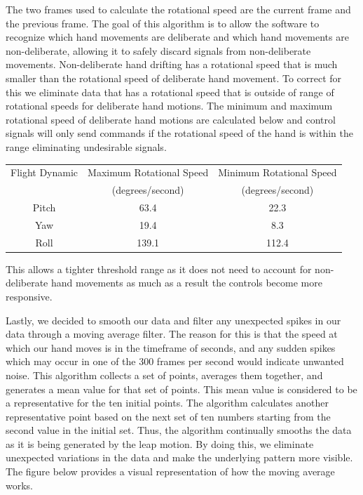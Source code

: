 \documentclass[letterpaper,english, 12pt]{article}
\begin{document}
The two frames used to calculate the rotational speed are the current frame and the previous frame. The goal of this algorithm is to allow the software to recognize which hand movements are deliberate and which hand movements are non-deliberate, allowing it to safely discard signals from non-deliberate movements. Non-deliberate hand drifting has a rotational speed that is much smaller than the rotational speed of deliberate hand movement. To correct for this we eliminate data that has a rotational speed that is outside of range of rotational speeds for deliberate hand motions.
The minimum and maximum rotational speed of deliberate hand motions are calculated below and control signals will only send commands if the rotational speed of the hand is within the range eliminating undesirable signals.

\begin{center}
	\begin{tabular}{|c|c|c|}
		\hline
			Flight Dynamic & Maximum Rotational Speed & Minimum Rotational Speed \\
			 & (degrees/second) & (degrees/second) \\
		\hline
			Pitch & 63.4 & 22.3 \\
		\hline
			Yaw & 19.4 & 8.3 \\
		\hline
			Roll & 139.1 & 112.4 \\
		\hline
	\end{tabular}
\end{center}

This allows a tighter threshold range as it does not need to account for non-deliberate hand movements as much as a result the controls become more responsive.

Lastly, we decided to smooth our data and filter any unexpected spikes in our data through a moving average filter.  The reason for this is that the speed at which our hand moves is in the timeframe of seconds, and any sudden spikes which may occur in one of the 300 frames per second would indicate unwanted noise. This algorithm collects a set of points, averages them together, and generates a mean value for that set of points. This mean value is considered to be a representative for the ten initial points. The algorithm calculates another representative point based on the next set of ten numbers starting from the second value in the initial set. Thus, the algorithm continually smooths the data as it is being generated by the leap motion. By doing this, we eliminate unexpected variations in the data and make the underlying pattern more visible. The figure below provides a visual representation of how the moving average works.  
\end{document}
